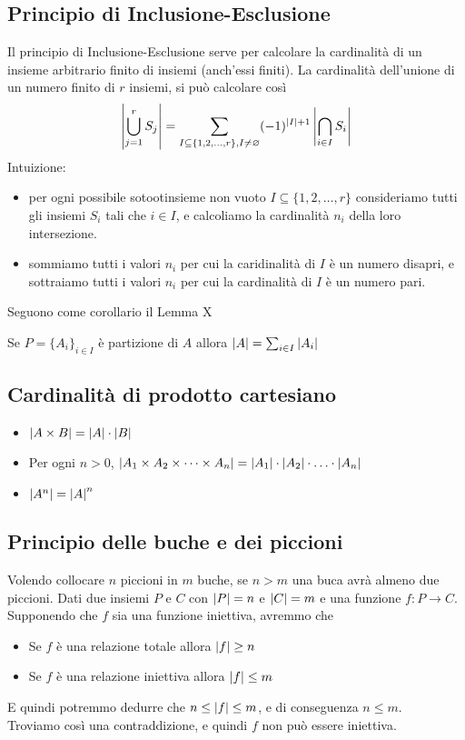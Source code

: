 \documentclass{article}
\begin{document}
\subsection*{Principio di Inclusione-Esclusione}
Il principio di Inclusione-Esclusione serve per calcolare la cardinalità di un insieme arbitrario finito di insiemi (anch'essi finiti).
La cardinalità dell'unione di un numero finito di \(r\) insiemi, si può calcolare così
\[\left\lvert \bigcup_{j = 1}^r S_j \right\rvert = \sum_{I \subseteq \{1,2,\ldots,r\}, I \neq \varnothing} (-1)^{\left\lvert I \right\rvert + 1} \left\lvert \bigcap_{i \in I} S_i \right\rvert \]
Intuizione:
\begin{itemize}
    \item per ogni possibile sotootinsieme non vuoto \(I \subseteq \{1,2,\ldots,r\}\) consideriamo tutti gli insiemi \(S_i\) tali che \(i \in I\), e calcoliamo la cardinalità \(n_i\) della loro intersezione.
    \item sommiamo tutti i valori \(n_i\) per cui la caridinalità di \(I\) è un numero disapri, e sottraiamo tutti i valori \(n_i\) per cui la cardinalità di \(I\) è un numero pari.
\end{itemize}
Seguono come corollario il Lemma X
\begin{center}
    Se \(P = \{A_i\}_{i \in I}\) è partizione di \(A\) allora \(\left\lvert A \right\rvert = \sum_{i \in I}\left\lvert A_i \right\rvert\)
\end{center}
\subsection*{Cardinalità di prodotto cartesiano}
\begin{itemize}
    \item \(\left\lvert A \times B \right\rvert = \left\lvert A \right\rvert \cdot \left\lvert B \right\rvert\)
    \item Per ogni \(n > 0\), \(\left\lvert A_1 \times A_2 \times \cdots \times A_n \right\rvert = \left\lvert A_1 \right\rvert \cdot \left\lvert A_2 \right\rvert \cdot \ldots \cdot \left\lvert A_n \right\rvert\)
    \item \(\left\lvert A^n \right\rvert = \left\lvert A \right\rvert^n\)
\end{itemize}
\subsection*{Principio delle buche e dei piccioni}
Volendo collocare \(n\) piccioni in \(m\) buche, se \(n > m\) una buca avrà almeno due piccioni.
Dati due insiemi \(P\) e \(C\) con \(\left\lvert P \right\rvert = n\) e \(\left\lvert C \right\rvert = m\) e una funzione \(f: P \rightarrow C\).
Supponendo che \(f\) sia una funzione iniettiva, avremmo che
\begin{itemize}
    \item Se \(f\) è una relazione totale allora \(\left\lvert f \right\rvert \geq n\)
    \item Se \(f\) è una relazione iniettiva allora \(\left\lvert f \right\rvert \leq m\)
\end{itemize}
E quindi potremmo dedurre che \(n \leq \left\lvert f \right\rvert \leq m\), e di conseguenza \(n \leq m\). \\
Troviamo così una contraddizione, e quindi \(f\) non può essere iniettiva.
\end{document}
